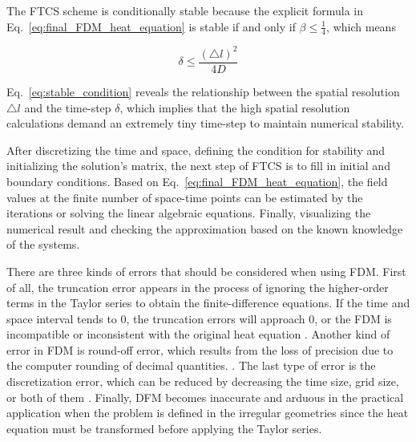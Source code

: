 The FTCS scheme is conditionally stable \cite{pletcher2012computational}
because the explicit formula in Eq.~\ref{eq:final_FDM_heat_equation}
is stable if and only if $\beta \leq \frac{1}{4}$, which means

\begin{equation}\label{eq:stable_condition}
  \delta \leq \frac{(\triangle l)^2}{4D}
\end{equation}

Eq.~\ref{eq:stable_condition} reveals the relationship between the
spatial resolution $\triangle l$ and the time-step $\delta$, which
implies that the high spatial resolution calculations demand an
extremely tiny time-step to maintain numerical stability.



After discretizing the time and space, defining the condition for
stability and initializing the solution's matrix, the next step of
FTCS is to fill in initial and boundary conditions. Based on
Eq.~\ref{eq:final_FDM_heat_equation}, the field values at the finite
number of space-time points can be estimated by the iterations or
solving the linear algebraic equations. Finally, visualizing the
numerical result and checking the approximation based on the known
knowledge of the systems.



There are three kinds of errors that should be considered when using
FDM. First of all, the truncation error appears in the process of
ignoring the higher-order terms in the Taylor series to obtain the
finite-difference equations. If the time and space interval tends to
$0$, the truncation errors will approach $0$, or the FDM is
incompatible or inconsistent with the original heat equation
\cite{crank1979mathematics}. Another kind of error in FDM is round-off
error, which results from the loss of precision due to the computer
rounding of decimal quantities. \cite{hoffman2018numerical}. The last
type of error is the discretization error, which can be reduced by
decreasing the time size, grid size, or both of them
\cite{crank1979mathematics}. Finally, DFM becomes inaccurate and
arduous in the practical application when the problem is defined in
the irregular geometries since the heat equation must be transformed
before applying the Taylor series.


